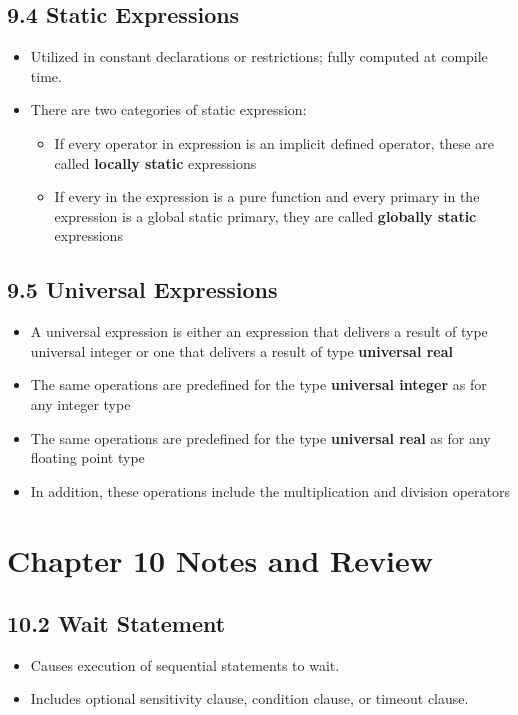 \documentclass[a4paper,12pt]{article}
\begin{document}
	
	\subsection*{9.4 Static Expressions}
	\begin{itemize}
		\item Utilized in constant declarations or restrictions; fully computed at compile time.
		\item There are two categories of static expression:
		\begin{itemize}
			\item If every operator in expression is an implicit defined operator, these are called \textbf{locally static}  expressions
			\item If every in the expression is a pure function and every primary in the expression is a global static primary, they are called \textbf{globally static}  expressions
		\end{itemize}
	\end{itemize}
	
	\subsection*{9.5 Universal Expressions}
	\begin{itemize}
		\item A universal expression is either an expression that delivers a result of type universal integer or one that delivers a result of type \textbf{universal real}
		\item The same operations are predefined for the type \textbf{universal integer} as for any integer type
		\item The same operations are predefined for the type \textbf{universal real} as for any floating point type
		\item In addition, these operations include the multiplication and division operators
		
	\end{itemize}
	
	
	\section*{Chapter 10 Notes and Review}
	
	
	\subsection*{10.2 Wait Statement}
	\begin{itemize}
		\item Causes execution of sequential statements to wait.
		\item Includes optional sensitivity clause, condition clause, or timeout clause.
	\end{itemize}
	
\end{document}
